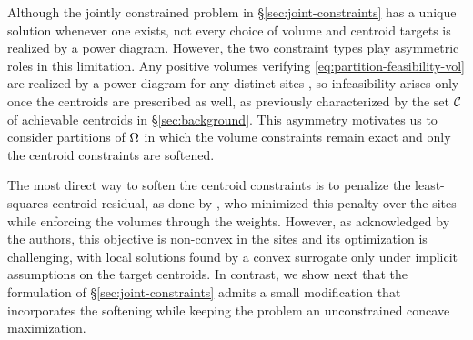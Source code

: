 \documentclass[main.tex]{subfiles}
\begin{document}
Although the jointly constrained problem in \S\ref{sec:joint-constraints} has a unique solution whenever one exists, not every choice of volume and centroid targets is realized by a power diagram.
% 
However, the two constraint types play asymmetric roles in this limitation.
Any positive volumes verifying \eqref{eq:partition-feasibility-vol} are realized by a power diagram for any distinct sites \cite{Aurenhammer1998Minkowski}, so infeasibility arises only once the centroids are prescribed as well, as previously characterized by the set $\mathcal{C}$ of achievable centroids in \S\ref{sec:background}.
This asymmetry motivates us to consider partitions of $\Omega$ in which the volume constraints remain exact and only the centroid constraints are {softened}.

The most direct way to soften the centroid constraints is to penalize the least-squares centroid residual, as done by \citet{Bourne2025Inverting}, who minimized this penalty over the sites while enforcing the volumes through the weights.
However, as acknowledged by the authors, this objective is non-convex in the sites and its optimization is challenging, with local solutions found by a convex surrogate only under implicit assumptions on the target centroids.
In contrast, we show next that the formulation of \S\ref{sec:joint-constraints} admits a small modification that incorporates the softening while keeping the problem an unconstrained concave maximization.
\end{document}
